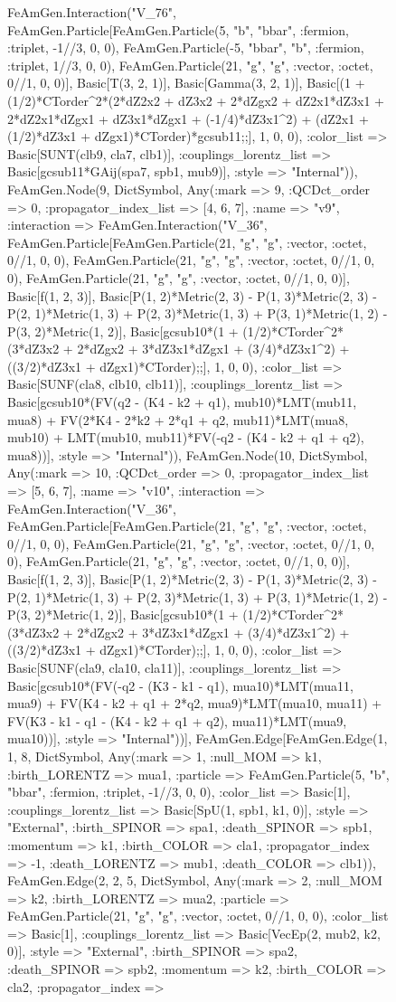\documentclass{revtex4}
\begin{document}
\begin{figure}[!htb]
\begin{center}
{FeAmGen.Interaction("V_76", FeAmGen.Particle[FeAmGen.Particle(5, "b", "bbar", :fermion, :triplet, -1//3, 0, 0), FeAmGen.Particle(-5, "bbar", "b", :fermion, :triplet, 1//3, 0, 0), FeAmGen.Particle(21, "g", "g", :vector, :octet, 0//1, 0, 0)], Basic[T(3, 2, 1)], Basic[Gamma(3, 2, 1)], Basic[(1 + (1/2)*CTorder^2*(2*dZ2x2 + dZ3x2 + 2*dZgx2 + dZ2x1*dZ3x1 + 2*dZ2x1*dZgx1 + dZ3x1*dZgx1 + (-1/4)*dZ3x1^2) + (dZ2x1 + (1/2)*dZ3x1 + dZgx1)*CTorder)*gcsub11;;], 1, 0, 0), :color_list => Basic[SUNT(clb9, cla7, clb1)], :couplings_lorentz_list => Basic[gcsub11*GAij(spa7, spb1, mub9)], :style => "Internal")), FeAmGen.Node(9, Dict{Symbol, Any}(:mark => 9, :QCDct_order => 0, :propagator_index_list => [4, 6, 7], :name => "v9", :interaction => FeAmGen.Interaction("V_36", FeAmGen.Particle[FeAmGen.Particle(21, "g", "g", :vector, :octet, 0//1, 0, 0), FeAmGen.Particle(21, "g", "g", :vector, :octet, 0//1, 0, 0), FeAmGen.Particle(21, "g", "g", :vector, :octet, 0//1, 0, 0)], Basic[f(1, 2, 3)], Basic[P(1, 2)*Metric(2, 3) - P(1, 3)*Metric(2, 3) - P(2, 1)*Metric(1, 3) + P(2, 3)*Metric(1, 3) + P(3, 1)*Metric(1, 2) - P(3, 2)*Metric(1, 2)], Basic[gcsub10*(1 + (1/2)*CTorder^2*(3*dZ3x2 + 2*dZgx2 + 3*dZ3x1*dZgx1 + (3/4)*dZ3x1^2) + ((3/2)*dZ3x1 + dZgx1)*CTorder);;], 1, 0, 0), :color_list => Basic[SUNF(cla8, clb10, clb11)], :couplings_lorentz_list => Basic[gcsub10*(FV(q2 - (K4 - k2 + q1), mub10)*LMT(mub11, mua8) + FV(2*K4 - 2*k2 + 2*q1 + q2, mub11)*LMT(mua8, mub10) + LMT(mub10, mub11)*FV(-q2 - (K4 - k2 + q1 + q2), mua8))], :style => "Internal")), FeAmGen.Node(10, Dict{Symbol, Any}(:mark => 10, :QCDct_order => 0, :propagator_index_list => [5, 6, 7], :name => "v10", :interaction => FeAmGen.Interaction("V_36", FeAmGen.Particle[FeAmGen.Particle(21, "g", "g", :vector, :octet, 0//1, 0, 0), FeAmGen.Particle(21, "g", "g", :vector, :octet, 0//1, 0, 0), FeAmGen.Particle(21, "g", "g", :vector, :octet, 0//1, 0, 0)], Basic[f(1, 2, 3)], Basic[P(1, 2)*Metric(2, 3) - P(1, 3)*Metric(2, 3) - P(2, 1)*Metric(1, 3) + P(2, 3)*Metric(1, 3) + P(3, 1)*Metric(1, 2) - P(3, 2)*Metric(1, 2)], Basic[gcsub10*(1 + (1/2)*CTorder^2*(3*dZ3x2 + 2*dZgx2 + 3*dZ3x1*dZgx1 + (3/4)*dZ3x1^2) + ((3/2)*dZ3x1 + dZgx1)*CTorder);;], 1, 0, 0), :color_list => Basic[SUNF(cla9, cla10, cla11)], :couplings_lorentz_list => Basic[gcsub10*(FV(-q2 - (K3 - k1 - q1), mua10)*LMT(mua11, mua9) + FV(K4 - k2 + q1 + 2*q2, mua9)*LMT(mua10, mua11) + FV(K3 - k1 - q1 - (K4 - k2 + q1 + q2), mua11)*LMT(mua9, mua10))], :style => "Internal"))], FeAmGen.Edge[FeAmGen.Edge(1, 1, 8, Dict{Symbol, Any}(:mark => 1, :null_MOM => k1, :birth_LORENTZ => mua1, :particle => FeAmGen.Particle(5, "b", "bbar", :fermion, :triplet, -1//3, 0, 0), :color_list => Basic[1], :couplings_lorentz_list => Basic[SpU(1, spb1, k1, 0)], :style => "External", :birth_SPINOR => spa1, :death_SPINOR => spb1, :momentum => k1, :birth_COLOR => cla1, :propagator_index => -1, :death_LORENTZ => mub1, :death_COLOR => clb1)), FeAmGen.Edge(2, 2, 5, Dict{Symbol, Any}(:mark => 2, :null_MOM => k2, :birth_LORENTZ => mua2, :particle => FeAmGen.Particle(21, "g", "g", :vector, :octet, 0//1, 0, 0), :color_list => Basic[1], :couplings_lorentz_list => Basic[VecEp(2, mub2, k2, 0)], :style => "External", :birth_SPINOR => spa2, :death_SPINOR => spb2, :momentum => k2, :birth_COLOR => cla2, :propagator_index => }
\end{center}
\end{figure}
\end{document}
